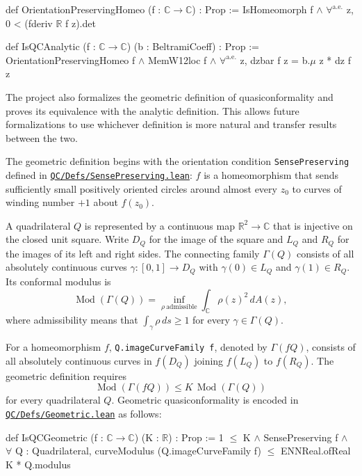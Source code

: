 \documentclass[letterpaper]{amsart}
\numberwithin{equation}{section}
\numberwithin{figure}{section}
\theoremstyle{plain}
\theoremstyle{definition}
\newcommand{\R}{\mathbb{R}}
\newcommand{\C}{\mathbb{C}}
\newcommand{\Mod}{\operatorname{Mod}}
\let\lean\nolinkurl
\newcommand{\leanfile}[1]{\href{https://github.com/will1491/no-wandering-domains/blob/1a39faf/NoWanderingDomains/#1}{\lean{#1}}}
\begin{document}
\begin{leancode}
def OrientationPreservingHomeo (f : $\C \to \C$) : Prop :=
  IsHomeomorph f $\land$
    $\forall^{\mathrm{a.e.}}$ z, 0 < (fderiv $\R$ f z).det

def IsQCAnalytic (f : $\C \to \C$) (b : BeltramiCoeff) : Prop :=
  OrientationPreservingHomeo f $\land$ MemW12loc f $\land$
    $\forall^{\mathrm{a.e.}}$ z, dzbar f z = b.$\mu$ z * dz f z
\end{leancode}

The project also formalizes the geometric definition of quasiconformality and proves its equivalence with the analytic definition. This allows future formalizations to use whichever definition is more natural and transfer results between the two.

The geometric definition begins with the orientation condition \lean{SensePreserving} defined in \leanfile{QC/Defs/SensePreserving.lean}: $f$ is a homeomorphism that sends sufficiently small positively oriented circles around almost every $z_0$ to curves of winding number $+1$ about $f(z_0)$.

A quadrilateral $Q$ is represented by a continuous map $\R^2\to\C$ that is injective on the closed unit square. Write $D_Q$ for the image of the square and $L_Q$ and $R_Q$ for the images of its left and right sides. The connecting family $\Gamma(Q)$ consists of all absolutely continuous curves $\gamma\colon[0,1]\to D_Q$ with $\gamma(0)\in L_Q$ and $\gamma(1)\in R_Q$. Its conformal modulus is
\[
  \Mod(\Gamma(Q))=
  \inf_{\rho\ \mathrm{admissible}}
  \int_{\C}\rho(z)^2\,dA(z),
\]
where admissibility means that $\int_\gamma\rho\,ds\geq1$ for every $\gamma\in\Gamma(Q)$.

For a homeomorphism $f$, \lean{Q.imageCurveFamily f}, denoted by $\Gamma(fQ)$, consists of all absolutely continuous curves in $f(D_Q)$ joining $f(L_Q)$ to $f(R_Q)$. The geometric definition requires
\[
  \Mod(\Gamma(fQ))\leq K\,\Mod(\Gamma(Q))
\]
for every quadrilateral $Q$. Geometric quasiconformality is encoded in \leanfile{QC/Defs/Geometric.lean} as follows:

\noindent\begin{minipage}{\linewidth}
\begin{leancode}
def IsQCGeometric (f : $\C \to \C$) (K : $\R$) : Prop :=
  1 $\leq$ K $\land$ SensePreserving f $\land$
    $\forall$ Q : Quadrilateral,
      curveModulus (Q.imageCurveFamily f)
        $\leq$ ENNReal.ofReal K * Q.modulus
\end{leancode}
\end{minipage}
\end{document}

